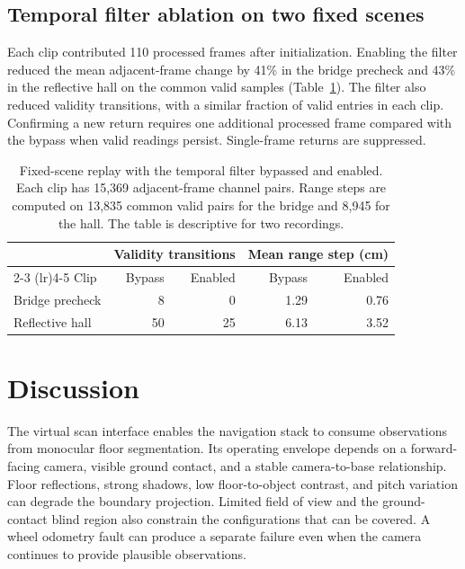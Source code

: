 \documentclass[pdflatex,sn-mathphys-num]{sn-jnl}
\begin{document}
\subsection{Temporal filter ablation on two fixed scenes}

Each clip contributed 110 processed frames after initialization. Enabling the filter reduced the mean adjacent-frame change by 41\% in the bridge precheck and 43\% in the reflective hall on the common valid samples (Table~\ref{tab:filter}). The filter also reduced validity transitions, with a similar fraction of valid entries in each clip. Confirming a new return requires one additional processed frame compared with the bypass when valid readings persist. Single-frame returns are suppressed.

\begin{table}[htbp]
\caption{Fixed-scene replay with the temporal filter bypassed and enabled. Each clip has 15,369 adjacent-frame channel pairs. Range steps are computed on 13,835 common valid pairs for the bridge and 8,945 for the hall. The table is descriptive for two recordings.}
\label{tab:filter}
\centering
\begin{tabular}{@{}lrrrr@{}}
\toprule
& \multicolumn{2}{c}{Validity transitions} & \multicolumn{2}{c}{Mean range step (cm)} \\
\cmidrule(lr){2-3} \cmidrule(lr){4-5}
Clip & Bypass & Enabled & Bypass & Enabled \\
\midrule
Bridge precheck & 8 & 0 & 1.29 & 0.76 \\
Reflective hall & 50 & 25 & 6.13 & 3.52 \\
\bottomrule
\end{tabular}
\end{table}

\section{Discussion}\label{sec:discussion}

The virtual scan interface enables the navigation stack to consume observations from monocular floor segmentation. Its operating envelope depends on a forward-facing camera, visible ground contact, and a stable camera-to-base relationship. Floor reflections, strong shadows, low floor-to-object contrast, and pitch variation can degrade the boundary projection. Limited field of view and the ground-contact blind region also constrain the configurations that can be covered. A wheel odometry fault can produce a separate failure even when the camera continues to provide plausible observations.
\end{document}
